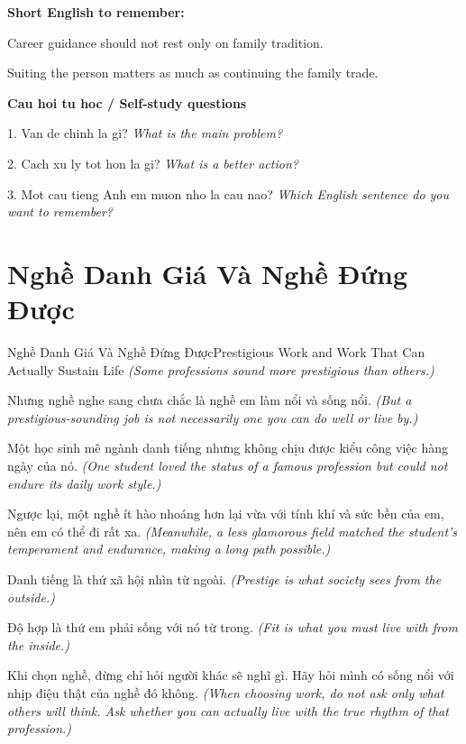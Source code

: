 \begin{ghinhoanh}
\textbf{Short English to remember:}

Career guidance should not rest only on family tradition.

Suiting the person matters as much as continuing the family trade.

\end{ghinhoanh}

\begin{tuhocnhanh}
\textbf{Cau hoi tu hoc / Self-study questions}

1. Van de chinh la gi? \textit{What is the main problem?}

2. Cach xu ly tot hon la gi? \textit{What is a better action?}

3. Mot cau tieng Anh em muon nho la cau nao? \textit{Which English sentence do you want to remember?}
\end{tuhocnhanh}
\ngancach

\section{Nghề Danh Giá Và Nghề Đứng Được}
\begin{truyen}{Nghề Danh Giá Và Nghề Đứng Được}{Prestigious Work and Work That Can Actually Sustain Life}
\textit{(Some professions sound more prestigious than others.)}

Nhưng nghề nghe sang chưa chắc là nghề em làm nổi và sống nổi.
\textit{(But a prestigious-sounding job is not necessarily one you can do well or live by.)}

Một học sinh mê ngành danh tiếng nhưng không chịu được kiểu công việc hàng ngày của nó.
\textit{(One student loved the status of a famous profession but could not endure its daily work style.)}

Ngược lại, một nghề ít hào nhoáng hơn lại vừa với tính khí và sức bền của em, nên em có thể đi rất xa.
\textit{(Meanwhile, a less glamorous field matched the student’s temperament and endurance, making a long path possible.)}

Danh tiếng là thứ xã hội nhìn từ ngoài.
\textit{(Prestige is what society sees from the outside.)}

Độ hợp là thứ em phải sống với nó từ trong.
\textit{(Fit is what you must live with from the inside.)}

\end{truyen}

\begin{baihoc}
Khi chọn nghề, đừng chỉ hỏi người khác sẽ nghĩ gì. Hãy hỏi mình có sống nổi với nhịp điệu thật của nghề đó không.
\textit{(When choosing work, do not ask only what others will think. Ask whether you can actually live with the true rhythm of that profession.)}
\end{baihoc}

